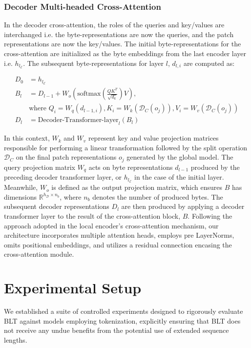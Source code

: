 \subsubsection{Decoder Multi-headed Cross-Attention} 

In the decoder cross-attention, the roles of the queries and key/values are interchanged i.e. the byte-representations are now the queries, and the patch representations are now the key/values. The initial byte-representations for the cross-attention are initialized as the byte embeddings from the last encoder layer i.e. $h_{l_{\mathcal{E}}}$. The subsequent byte-representations for layer $l$, $d_{l,i}$ are computed as:

\begin{align}
D_0 &= h_{l_{\mathcal{E}}} \\
B_l &= D_{l-1} + W_o\left(\text{softmax}\left(\frac{QK^T}{\sqrt{d_k}}\right)V\right), \\
  &\text{where } Q_i = W_q(d_{l-1,i}), K_i = W_k(\mathcal{D}_C(o_j)), V_i = W_v(\mathcal{D}_C(o_j)) \\
  D_l &= \text{Decoder-Transformer-layer}_l(B_l)
\end{align}

In this context, $W_k$ and $W_v$ represent key and value projection matrices responsible for performing a linear transformation followed by the split operation $\mathcal{D}_C$ on the final patch representations $o_j$ generated by the global model. The query projection matrix $W_q$ acts on byte representations $d_{l-1}$ produced by the preceding decoder transformer layer, or $h_{l_{\mathcal{E}}}$ in the case of the initial layer. Meanwhile, $W_o$ is defined as the output projection matrix, which ensures $B$ has dimensions $\mathbb{R}^{h_{\mathcal{D}} \times n_b}$, where $n_b$ denotes the number of produced bytes. The subsequent decoder representations $D_l$ are then produced by applying a decoder transformer layer to the result of the cross-attention block, $B$. Following the approach adopted in the local encoder’s cross-attention mechanism, our architecture incorporates multiple attention heads, employs pre LayerNorms, omits positional embeddings, and utilizes a residual connection encasing the cross-attention module.

\section{Experimental Setup}
\label{section:experiments}
We established a suite of controlled experiments designed to rigorously evaluate {\textsc BLT} against models employing tokenization, explicitly ensuring that {\textsc BLT} does not receive any undue benefits from the potential use of extended sequence lengths.

